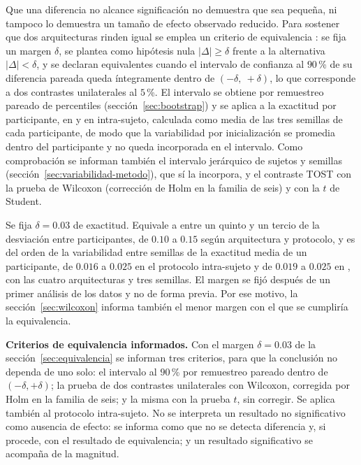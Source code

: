 Que una diferencia no alcance significación no demuestra que sea pequeña, ni tampoco lo
demuestra un tamaño de efecto observado reducido. Para sostener que dos arquitecturas rinden
igual se emplea un criterio de equivalencia \cite{schuirmann1987,lakens2017}: se fija un
margen $\delta$, se plantea como hipótesis nula $|\Delta| \geq \delta$ frente a la
alternativa $|\Delta| < \delta$, y se declaran
equivalentes cuando el intervalo de confianza al $90$\,\% de su diferencia pareada queda
íntegramente dentro de $(-\delta,\ +\delta)$, lo que corresponde a dos contrastes unilaterales
al $5$\,\%. El intervalo se obtiene por remuestreo pareado de percentiles
(sección~\ref{sec:bootstrap}) y se aplica a la exactitud por participante, en \loso{} y en
intra-sujeto, calculada como media de las tres semillas de cada participante, de modo que la
variabilidad por inicialización se promedia dentro del participante y no queda incorporada en el
intervalo. Como comprobación se informan también el intervalo jerárquico de sujetos y semillas
(sección~\ref{sec:variabilidad-metodo}), que sí la incorpora, y el contraste TOST con la prueba de
Wilcoxon (corrección de Holm en la familia de seis) y con la $t$ de Student.

Se fija $\delta = 0.03$ de exactitud. Equivale a entre un quinto y un tercio de la
desviación entre participantes, de $0.10$ a $0.15$ según arquitectura y protocolo, y es del
orden de la variabilidad entre semillas de la exactitud media de un participante, de
$0.016$ a $0.025$ en el protocolo intra-sujeto y de $0.019$ a $0.025$ en \loso{}, con las cuatro
arquitecturas y tres semillas. El margen se
fijó después de un primer análisis de los datos y no de forma previa. Por ese motivo, la
sección~\ref{sec:wilcoxon} informa también el menor margen con el que se cumpliría la
equivalencia.

\textbf{Criterios de equivalencia informados.} Con el margen $\delta = 0.03$ de la
sección~\ref{sec:equivalencia} se informan tres criterios, para que la conclusión no
dependa de uno solo: el intervalo al $90$\,\% por remuestreo pareado dentro de
$(-\delta, +\delta)$; la prueba de dos contrastes unilaterales con Wilcoxon, corregida por
Holm en la familia de seis; y la misma con la prueba $t$, sin corregir. Se aplica también al
protocolo intra-sujeto. No se interpreta un resultado no significativo como ausencia de
efecto: se informa como que no se detecta diferencia y, si procede, con el resultado de
equivalencia; y un resultado significativo se acompaña de la magnitud.



